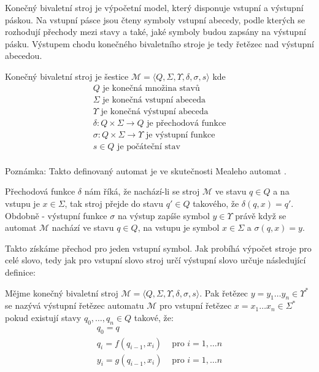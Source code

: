 \documentclass[a4paper,10pt]{article}
\begin{document}
Konečný bivaletní stroj je výpočetní model, který disponuje vstupní a výstupní páskou. Na vstupní pásce jsou čteny symboly vstupní abecedy, podle kterých se rozhodují přechody mezi stavy a také, jaké symboly budou zapsány na výstupní pásku. Výstupem chodu konečného bivaletního stroje je tedy řetězec nad výstupní abecedou.

\begin{definition}\label{finite-bivalent-machine}
Konečný bivaletní stroj je šestice $\mathcal{M} = \langle Q, \Sigma, \Upsilon,  \delta, \sigma, s \rangle$ kde
$$
\begin{array}{l}
  Q \text{ je konečná množina stavů} \\
  \Sigma \text{ je konečná vstupní abeceda} \\
  \Upsilon \text{ je konečná výstupní abeceda} \\
  \delta: Q \times \Sigma \rightarrow Q  \text{  je přechodová funkce} \\
  \sigma: Q \times \Sigma \rightarrow \Upsilon  \text{  je výstupní funkce} \\
  s \in Q \text{ je počáteční stav} \\
\end{array}
$$
\end{definition}

Poznámka: Takto definovaný automat je ve skutečnosti Mealeho automat \cite{mealy-meth-for-synth-seq-circs}.

Přechodová funkce $\delta$ nám říká, že nachází-li se stroj $\mathcal{M}$ ve stavu $q \in Q$ a na vstupu je $x \in \Sigma$, tak stroj přejde do stavu $q' \in Q$ takového, že $\delta(q, x) = q'$. Obdobně - výstupní funkce $\sigma$ na výstup zapíše symbol $y \in \Upsilon$ právě když se automat $\mathcal{M}$ nachází ve stavu $q \in Q$, na vstupu je symbol $x \in \Sigma$ a $\sigma(q, x) = y$. 

Takto získáme přechod pro jeden vstupní symbol. Jak probíhá výpočet stroje pro celé slovo, tedy jak pro vstupní slovo stroj určí výstupní slovo určuje následující definice:

\begin{definition}\label{output-string-of-finite-bivalent-machine}
Mějme konečný bivaletní stroj $\mathcal{M} = \langle Q, \Sigma, \Upsilon,  \delta, \sigma, s \rangle$. Pak řetězec $y = y_1 \dots y_n \in \Upsilon^*$ se nazývá výstupní řetězec automatu $\mathcal{M}$ pro vstupní řetězec $x = x_1 \dots x_n \in \Sigma^*$ pokud existují stavy $q_0, \dots, q_n \in Q$ takové, že:
$$
\begin{array}{ll}
  q_0 = q  \\
  q_i = f(q_{i-1}, x_i)	& \text{ pro } i = 1, \dots n	\\
  y_i = g(q_{i-1}, x_i)	& \text{ pro } i = 1, \dots n	\\
\end{array}
$$
\end{definition}
\end{document}
